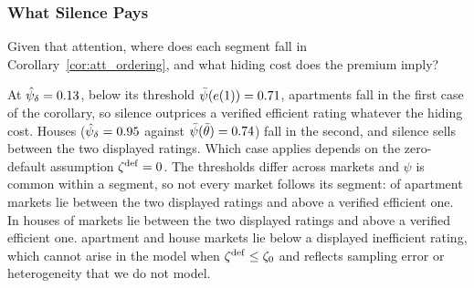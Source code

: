 \subsubsection{What Silence Pays}
\label{ss:att_pays}

Given that attention, where does each segment fall in Corollary~\ref{cor:att_ordering}, and what hiding cost does the premium imply?

At $\hat\psi_\delta=0.13{}$, below its threshold $\bar\psi(e(1))=0.71{}$, apartments fall in the first case of the corollary, so silence outprices a verified efficient rating whatever the hiding cost. Houses ($\hat\psi_\delta=0.95{}$ against $\bar\psi(\bar\theta)=0.74{}$) fall in the second, and silence sells between the two displayed ratings. Which case applies depends on the zero-default assumption $\zeta^{\rm def}=0$. The thresholds differ across markets and $\psi$ is common within a segment, so not every market follows its segment: \attNBetweenApt{} of \attNMarketsApt{} apartment markets lie between the two displayed ratings and \attNDgtBApt{} above a verified efficient one. In houses \attNBetweenHouse{} of \attNMarketsHouse{} markets lie between the two displayed ratings and \attNDgtBHouse{} above a verified efficient one. \attRawNNegApt{} apartment and \attRawNNegHouse{} house markets lie below a displayed inefficient rating, which cannot arise in the model when $\zeta^{\rm def}\le\zeta_0$ and reflects sampling error or heterogeneity that we do not model.

